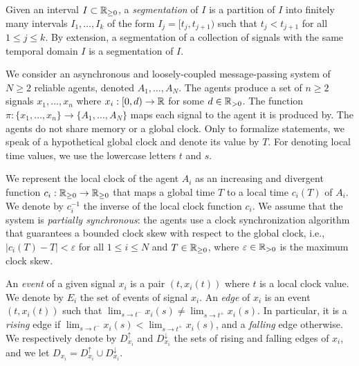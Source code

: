 Given an interval $I \subset \mathbb{R}_{\geq 0}$, a \emph{segmentation} of $I$ is a partition of $I$ into finitely many intervals $I_1, \ldots, I_k$ of the form $I_j = [t_j, t_{j+1})$ such that $t_j < t_{j+1}$ for all $1 \leq j \leq k$.
By extension, a segmentation of a collection of signals with the same temporal domain $I$ is a segmentation of $I$.


We consider an asynchronous and loosely-coupled message-passing system of $N \geq 2$ reliable agents, denoted $A_1, \ldots, A_N$.
The agents produce a set of $n \geq 2$ signals $x_1, \ldots, x_n$ where $x_i : [0,d) \to \mathbb{R}$ for some $d \in \mathbb{R}_{> 0}$.
The function $\pi : \{x_1, \ldots, x_n\} \to \{A_1, \ldots, A_N\}$ maps each signal to the agent it is produced by.
The agents do not share memory or a global clock.
Only to formalize statements, we speak of a hypothetical global clock and denote its value by $T$.
For denoting local time values, we use the lowercase letters $t$ and $s$.

We represent the local clock of the agent $A_i$ as an increasing and divergent function $c_i : \mathbb{R}_{\geq 0} \to \mathbb{R}_{\geq 0}$ that maps a global time $T$ to a local time $c_i(T)$ of $A_i$.
We denote by $c_i^{-1}$ the inverse of the local clock function $c_i$.
We assume that the system is \emph{partially synchronous}: the agents use a clock synchronization algorithm that guarantees a bounded clock skew with respect to the global clock, i.e., $|c_i(T) - T| < \varepsilon$ for all $1 \leq i \leq N$ and $T \in \mathbb{R}_{\geq 0}$, where $\varepsilon \in \mathbb{R}_{> 0}$ is the maximum clock skew.

An \emph{event} of a given signal $x_i$ is a pair $(t, x_i(t))$ where $t$ is a local clock value.
We denote by $E_i$ the set of events of signal $x_i$.
An \emph{edge} of $x_i$ is an event $(t, x_i(t))$ such that $\lim_{s \to t^-} x_i(s) \neq \lim_{s \to t^+} x_i(s)$.
In particular, it is a \emph{rising} edge if $\lim_{s \to t^-} x_i(s) < \lim_{s \to t^+} x_i(s)$, and a \emph{falling} edge otherwise.
We respectively denote by $D_{x_i}^\uparrow$ and $D_{x_i}^\downarrow$ the sets of rising and falling edges of $x_i$, and we let $D_{x_i} = D_{x_i}^\uparrow \cup D_{x_i}^\downarrow$.


